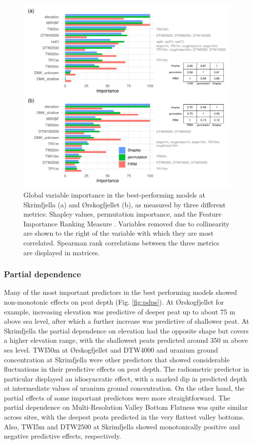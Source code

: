 \documentclass[soil, manuscript]{copernicus}
\begin{document}
\begin{figure}
\includegraphics[width=1\linewidth]{figures/variable_importance} \caption{Global variable importance in the best-performing models at Skrimfjella (a) and Ørskogfjellet (b), as measured by three different metrics: Shapley values, permutation importance, and the Feature Importance Ranking Measure \citep{greenwellVariableImportancePlots2020}. Variables removed due to collinearity are shown to the right of the variable with which they are most correlated. Spearman rank correlations between the three metrics are displayed in matrices.}\label{fig:varImp}
\end{figure}

\subsubsection{Partial dependence}

Many of the most important predictors in the best performing models showed non-monotonic effects on peat depth (Fig. \ref{fig:pdps}).
At Ørskogfjellet for example, increasing elevation was predictive of deeper peat up to about 75 m above sea level, after which a further increase was predictive of shallower peat.
At Skrimfjella the partial dependence on elevation had the opposite shape but covers a higher elevation range, with the shallowest peats predicted around 350 m above sea level.
TWI50m at Ørskogfjellet and DTW4000 and uranium ground concentration at Skrimfjella were other predictors that showed considerable fluctuations in their predictive effects on peat depth.
The radiometric predictor in particular displayed an idiosyncratic effect, with a marked dip in predicted depth at intermediate values of uranium ground concentration.
On the other hand, the partial effects of some important predictors were more straightforward.
The partial dependence on Multi-Resolution Valley Bottom Flatness was quite similar across sites, with the deepest peats predicted in the very flattest valley bottoms.
Also, TWI5m and DTW2500 at Skrimfjella showed monotonically positive and negative predictive effects, respectively.
\end{document}
